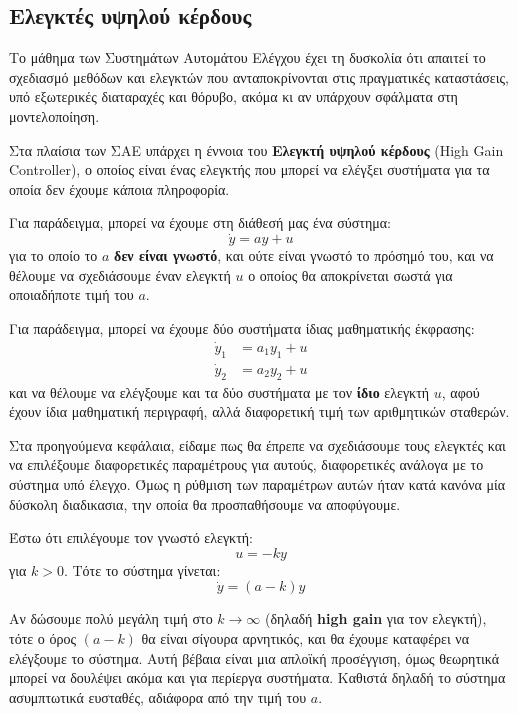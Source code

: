\documentclass[11pt,a4paper,notitlepage,fleqn]{article}
\begin{document}
\subsection{Ελεγκτές υψηλού κέρδους}

Το μάθημα των Συστημάτων Αυτομάτου Ελέγχου έχει τη δυσκολία ότι απαιτεί το σχεδιασμό
μεθόδων και ελεγκτών που ανταποκρίνονται στις πραγματικές καταστάσεις, υπό εξωτερικές
διαταραχές και θόρυβο, ακόμα κι αν υπάρχουν σφάλματα στη μοντελοποίηση.

Στα πλαίσια των ΣΑΕ υπάρχει η έννοια του \textbf{Ελεγκτή υψηλού κέρδους} (High Gain Controller),
ο οποίος είναι ένας ελεγκτής που μπορεί να ελέγξει συστήματα για τα οποία δεν έχουμε κάποια πληροφορία.

Για παράδειγμα, μπορεί να έχουμε στη διάθεσή μας ένα σύστημα:
\[
\dot y = ay + u
\]
για το οποίο το \( a \) \textbf{δεν είναι γνωστό}, και ούτε
είναι γνωστό το πρόσημό του, και να θέλουμε να σχεδιάσουμε έναν
ελεγκτή \( u \) ο οποίος θα αποκρίνεται σωστά για οποιαδήποτε τιμή
του \( a \).

Για παράδειγμα, μπορεί να έχουμε δύο συστήματα ίδιας μαθηματικής έκφρασης:
\begin{align*}
	\dot y_1 &= a_1 y_1 + u\\
	\dot y_2 &= a_2 y_2 + u
\end{align*}
και να θέλουμε να ελέγξουμε και τα δύο συστήματα με τον \textbf{ίδιο} ελεγκτή
\( u \), αφού έχουν ίδια μαθηματική περιγραφή, αλλά διαφορετική τιμή των
αριθμητικών σταθερών.

Στα προηγούμενα κεφάλαια, είδαμε πως θα έπρεπε να σχεδιάσουμε τους ελεγκτές και να
επιλέξουμε διαφορετικές παραμέτρους για αυτούς, διαφορετικές ανάλογα με το σύστημα
υπό έλεγχο. Όμως η ρύθμιση των παραμέτρων αυτών ήταν κατά κανόνα μία δύσκολη διαδικασια,
την οποία θα προσπαθήσουμε να αποφύγουμε.

Έστω ότι επιλέγουμε τον γνωστό ελεγκτή:
\[
u = -ky
\]
για \( k>0 \). Τότε το σύστημα γίνεται:
\[
\dot y = (a-k)y
\]

Αν δώσουμε πολύ μεγάλη τιμή στο \( k \to \infty \) (δηλαδή \textbf{high gain} για τον ελεγκτή), τότε ο
όρος \( (a-k) \) θα είναι σίγουρα αρνητικός, και θα έχουμε καταφέρει να ελέγξουμε το σύστημα. Αυτή βέβαια
είναι μια απλοϊκή προσέγγιση, όμως θεωρητικά μπορεί να δουλέψει ακόμα και για περίεργα συστήματα. Καθιστά δηλαδή το σύστημα ασυμπτωτικά ευσταθές, αδιάφορα από την τιμή του \( a \).

\paragraph{}
\end{document}
